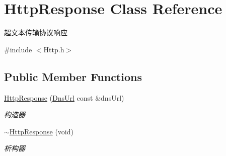 \hypertarget{class_http_response}{}\section{Http\+Response Class Reference}
\label{class_http_response}


超文本传输协议响应  




{\ttfamily \#include $<$Http.\+h$>$}

\subsection*{Public Member Functions}
\begin{DoxyCompactItemize}
\item 
\hyperlink{class_http_response_a85d8b6b97c7ca4334e2d37ad4425a7c2}{Http\+Response} (\hyperlink{class_dns_url}{Dns\+Url} const \&dns\+Url)
\begin{DoxyCompactList}\small\item\em 构造器 \end{DoxyCompactList}\item 
\mbox{\label{class_http_response_a9a03a4b1585dbff76f8712d686469b82}} 
\hyperlink{class_http_response_a9a03a4b1585dbff76f8712d686469b82}{$\sim$\+Http\+Response} (void)
\begin{DoxyCompactList}\small\item\em 析构器 \end{DoxyCompactList}\end{DoxyCompactItemize}
